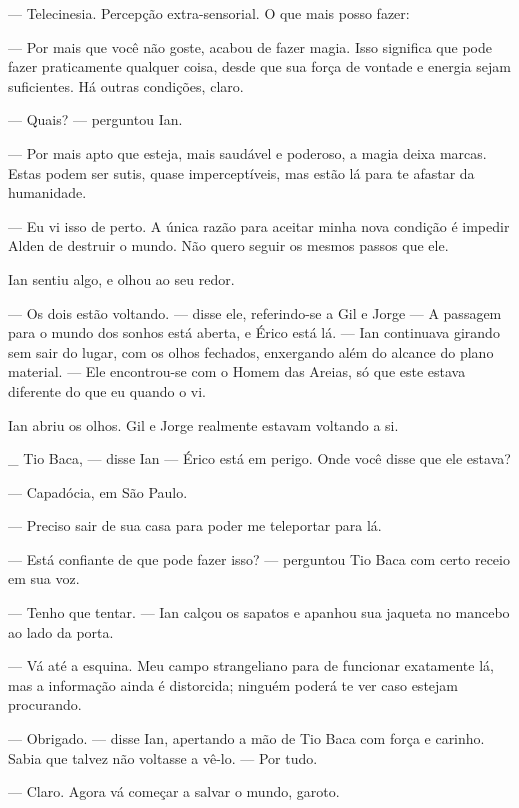 --- Telecinesia. Percepção extra-sensorial. O que mais posso fazer:

--- Por mais que você não goste, acabou de fazer magia. Isso significa
que pode fazer praticamente qualquer coisa, desde que sua força de
vontade e energia sejam suficientes. Há outras condições, claro.

--- Quais? --- perguntou Ian.

--- Por mais apto que esteja, mais saudável e poderoso, a magia deixa
marcas. Estas podem ser sutis, quase imperceptíveis, mas estão lá para
te afastar da humanidade.

--- Eu vi isso de perto. A única razão para aceitar minha nova condição
é impedir Alden de destruir o mundo. Não quero seguir os mesmos passos
que ele.

Ian sentiu algo, e olhou ao seu redor.

--- Os dois estão voltando. --- disse ele, referindo-se a Gil e Jorge
--- A passagem para o mundo dos sonhos está aberta, e Érico está lá. ---
Ian continuava girando sem sair do lugar, com os olhos fechados,
enxergando além do alcance do plano material. --- Ele encontrou-se com o
Homem das Areias, só que este estava diferente do que eu quando o vi.

Ian abriu os olhos. Gil e Jorge realmente estavam voltando a si.

_ Tio Baca, --- disse Ian --- Érico está em perigo. Onde você disse que
ele estava?

--- Capadócia, em São Paulo.

--- Preciso sair de sua casa para poder me teleportar para lá.

--- Está confiante de que pode fazer isso? --- perguntou Tio Baca com
certo receio em sua voz.

--- Tenho que tentar. --- Ian calçou os sapatos e apanhou sua jaqueta no
mancebo ao lado da porta.

--- Vá até a esquina. Meu campo strangeliano para de funcionar
exatamente lá, mas a informação ainda é distorcida; ninguém poderá te
ver caso estejam procurando.

--- Obrigado. --- disse Ian, apertando a mão de Tio Baca com força e
carinho. Sabia que talvez não voltasse a vê-lo. --- Por tudo.

--- Claro. Agora vá começar a salvar o mundo, garoto.
